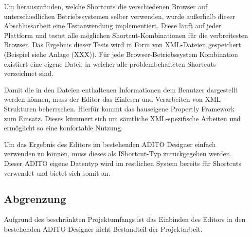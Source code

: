 Um herauszufinden, welche Shortcuts die verschiedenen Browser auf unterschiedlichen Betriebssystemen selber verwenden, wurde außerhalb dieser Abschlussarbeit eine Testanwendung implementiert. Diese läuft auf jeder Plattform und testet alle möglichen Shortcut-Kombinationen für die verbreitesten Browser. Das Ergebnis dieser Tests wird in Form von XML-Dateien gespeichert (Beispiel siehe Anlage (XXX)). Für jede Browser-Betriebssystem Kombination existiert eine eigene Datei, in welcher alle problembehafteten Shortcuts verzeichnet sind.

Damit die in den Dateien enthaltenen Informationen dem Benutzer dargestellt werden können, muss der Editor das Einlesen und Verarbeiten von XML-Strukturen beherrschen. Hierfür kommt das hauseigene Propertly Framework zum Einsatz. Dieses kümmert sich um sämtliche XML-spezifische Arbeiten und ermöglicht so eine konfortable Nutzung.

Um das Ergebnis des Editors im bestehenden ADITO Designer einfach verwenden zu können, muss dieses als IShortcut-Typ zurückgegeben werden. Dieser ADITO eigene Datentyp wird im restlichen System bereits für Shortcuts verwendet und bietet sich somit an.

\subsection{Abgrenzung}

Aufgrund des beschränkten Projektumfangs ist das Einbinden des Editors in den bestehenden ADITO Designer nicht Bestandteil der Projektarbeit.






\newpage